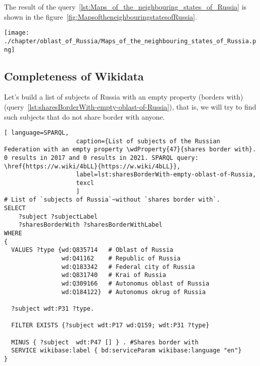 The result of the query~\protect\ref{lst:Maps_of_the_neighbouring_states_of_Russia} is shown in the figure~\ref{fig:MapsoftheneighbouringstatesofRussia}.

\begin{figure*}[h]
	\texttt{[image: ./chapter/oblast\_of\_Russia/Maps\_of\_the\_neighbouring\_states\_of\_Russia.png]}
	\caption[Map of foreign countries bordering the subjects of Russia, 2021.]{Map of foreign countries bordering the subjects of Russia, 2021. The map is based on the data received by the request~\protect\ref{lst:Maps_of_the_neighbouring_states_of_Russia}.}%
      \label{fig:MapsoftheneighbouringstatesofRussia}%
\end{figure*}

\newpage
\subsection{Completeness of Wikidata}

Let's build a list of subjects of Russia with an empty property  (borders with) (query~\protect\ref{lst:sharesBorderWith-empty-oblast-of-Russia}), that is, we will try to find such subjects that do not share border with anyone.

\label{question:q_subjects_of_Russia_2}

\lstset{numbers=left, firstnumber=1, frame=single}
\begin{lstlisting}[ language=SPARQL, 
                    caption={List of subjects of the Russian Federation with an empty property \wdProperty{47}{shares border with}. 0 results in 2017 and 0 results in 2021. SPARQL query: \href{https://w.wiki/4bLL}{https://w.wiki/4bLL}},
                    label=lst:sharesBorderWith-empty-oblast-of-Russia,
                    texcl 
                    ]
# List of `subjects of Russia`~without `shares border with`. 
SELECT 
    ?subject ?subjectLabel 
    ?sharesBorderWith ?sharesBorderWithLabel
WHERE
{
  VALUES ?type {wd:Q835714   # Oblast of Russia
                wd:Q41162    # Republic of Russia
                wd:Q183342   # Federal city of Russia
                wd:Q831740   # Krai of Russia
                wd:Q309166   # Autonomus oblast of Russia
                wd:Q184122}  # Autonomus okrug of Russia
  
  ?subject wdt:P31 ?type.
  
  FILTER EXISTS {?subject wdt:P17 wd:Q159; wdt:P31 ?type}
  
  MINUS { ?subject  wdt:P47 [] } . #Shares border with 
  SERVICE wikibase:label { bd:serviceParam wikibase:language "en"}
}
\end{lstlisting}%

